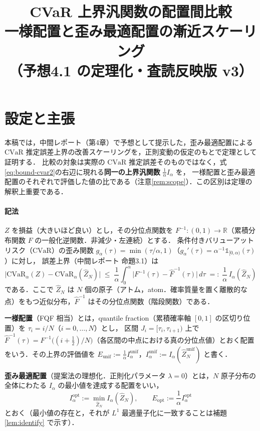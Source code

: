 \documentclass[a4paper,10pt]{jsarticle}
\title{CVaR 上界汎関数の配置間比較\\
  一様配置と歪み最適配置の漸近スケーリング\\
  （予想4.1 の定理化・査読反映版 v3）}
\author{}
\date{}
\theoremstyle{definition}
\newcommand{\CVaR}{\mathrm{CVaR}}
\newcommand{\Finv}{F^{-1}}
\newcommand{\Fhinv}{\hat{F}^{-1}}
\newcommand{\R}{\mathbb{R}}
\newcommand{\Eunif}{E_{\mathrm{unif}}}
\newcommand{\Eopt}{E_{\mathrm{opt}}}
\newcommand{\Iunif}{I_\alpha^{\mathrm{unif}}}
\newcommand{\Iopt}{I_\alpha^{\mathrm{opt}}}
\begin{document}
\maketitle

\section{設定と主張}
\label{sec:setting}

本稿では，中間レポート（第4章）で予想として提示した，歪み最適配置による $\CVaR$ 推定誤差上界の改善スケーリングを，正則変動の仮定のもとで定理として証明する．
比較の対象は実際の $\CVaR$ 推定誤差そのものではなく，式\eqref{eq:bound-cvar2}の右辺に現れる\textbf{同一の上界汎関数} $\frac1\alpha I_\alpha$ を，
一様配置と歪み最適配置のそれぞれで評価した値の比である（注意\ref{rem:scope}）．この区別は定理の解釈上重要である．

\paragraph{記法}
$Z$ を損益（大きいほど良い）とし，その分位点関数を $\Finv\colon(0,1)\to\R$（累積分布関数 $F$ の一般化逆関数．非減少・左連続）とする．
条件付きバリューアットリスク（$\CVaR$）の歪み関数 $g_\alpha(\tau)=\min(\tau/\alpha,1)$（$g_\alpha'(\tau)=\alpha^{-1}\mathbb{1}_{[0,\alpha)}(\tau)$）に対し，
誤差上界（中間レポート 命題3.1）は
\begin{equation}
  \bigl|\CVaR_\alpha(Z)-\CVaR_\alpha(\hat Z_N)\bigr|
  \;\le\;\frac1\alpha\int_0^\alpha\bigl|\Finv(\tau)-\Fhinv(\tau)\bigr|\,d\tau
  \;=:\;\frac1\alpha\,I_\alpha(\hat Z_N)
  \label{eq:bound-cvar2}
\end{equation}
である．ここで $\hat Z_N$ は $N$ 個の原子（アトム，atom．確率質量を置く離散的な点）をもつ近似分布，$\Fhinv$ はその分位点関数（階段関数）である．

\textbf{一様配置}（FQF 相当）とは，quantile fraction（累積確率軸 $[0,1]$ の区切り位置）を $\tau_i=i/N$（$i=0,\dots,N$）とし，
区間 $J_i=[\tau_i,\tau_{i+1})$ 上で $\Fhinv(\tau)=\Finv\bigl((i+\tfrac12)/N\bigr)$（各区間の中点における真の分位点値）とおく配置をいう．その上界の評価値を
$\Eunif:=\frac1\alpha\Iunif$，$\Iunif:=I_\alpha(\hat Z_N^{\mathrm{unif}})$ と書く．

\textbf{歪み最適配置}（提案法の理想化．正則化パラメータ $\lambda=0$）とは，$N$ 原子分布の全体にわたる $I_\alpha$ の最小値を達成する配置をいい，
\begin{equation}
  \Iopt:=\min_{\hat Z_N}I_\alpha(\hat Z_N),\qquad \Eopt:=\frac1\alpha\Iopt
  \label{eq:def-opt}
\end{equation}
とおく（最小値の存在と，それが $L^1$ 最適量子化に一致することは補題\ref{lem:identify} で示す）．
\end{document}

